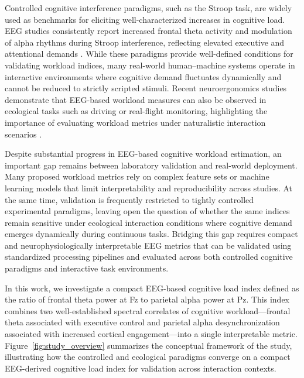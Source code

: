 \documentclass[10pt]{iopart}
\begin{document}
Controlled cognitive interference paradigms, such as the Stroop task, are widely used as benchmarks for eliciting well-characterized increases in cognitive load. EEG studies consistently report increased frontal theta activity and modulation of alpha rhythms during Stroop interference, reflecting elevated executive and attentional demands \cite{c5,c9}. While these paradigms provide well-defined conditions for validating workload indices, many real-world human--machine systems operate in interactive environments where cognitive demand fluctuates dynamically and cannot be reduced to strictly scripted stimuli. Recent neuroergonomics studies demonstrate that EEG-based workload measures can also be observed in ecological tasks such as driving or real-flight monitoring, highlighting the importance of evaluating workload metrics under naturalistic interaction scenarios \cite{DiFlumeri2018_RealDrivingMWL,Dehais2019_RealFlightDryEEG}.

Despite substantial progress in EEG-based cognitive workload estimation, an important gap remains between laboratory validation and real-world deployment. Many proposed workload metrics rely on complex feature sets or machine learning models that limit interpretability and reproducibility across studies. At the same time, validation is frequently restricted to tightly controlled experimental paradigms, leaving open the question of whether the same indices remain sensitive under ecological interaction conditions where cognitive demand emerges dynamically during continuous tasks. Bridging this gap requires compact and neurophysiologically interpretable EEG metrics that can be validated using standardized processing pipelines and evaluated across both controlled cognitive paradigms and interactive task environments.

In this work, we investigate a compact EEG-based cognitive load index defined as the ratio of frontal theta power at Fz to parietal alpha power at Pz. This index combines two well-established spectral correlates of cognitive workload—frontal theta associated with executive control and parietal alpha desynchronization associated with increased cortical engagement—into a single interpretable metric. 
Figure~\ref{fig:study_overview} summarizes the conceptual framework of the study, illustrating how the controlled and ecological paradigms converge on a compact EEG-derived cognitive load index for validation across interaction contexts.
\end{document}
